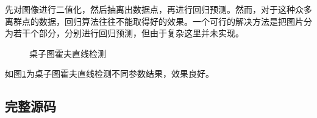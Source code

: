 \documentclass{article}
\begin{document}
先对图像进行二值化，然后抽离出数据点，再进行回归预测。然而，对于这种众多离群点的数据，回归算法往往不能取得好的效果。一个可行的解决方法是把图片分为若干个部分，分别进行回归预测，但由于复杂这里并未实现。

\begin{figure}[ht]
	\centering
	\quad
	\caption{桌子图霍夫直线检测}
	\label{fig:desk-hough-line}
\end{figure}

如图\ref{fig:desk-hough-line}为桌子图霍夫直线检测不同参数结果，效果良好。



























\clearpage
\begin{appendix}
	\section{完整源码}
	
	
	
	
	
	
\end{appendix}
\end{document}
